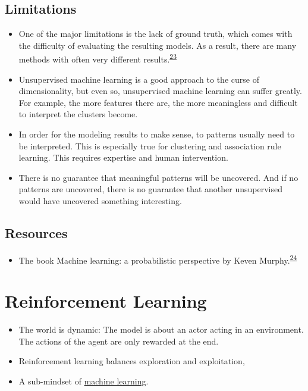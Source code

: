 \documentclass[
  10pt,
]{scrbook}
\providecommand{\tightlist}{%
  \setlength{\itemsep}{0pt}\setlength{\parskip}{0pt}}
\begin{document}
\hypertarget{limitations-7}{%
\section{Limitations}\label{limitations-7}}

\begin{itemize}
\tightlist
\item
  One of the major limitations is the lack of ground truth, which comes with the difficulty of evaluating the resulting models. As a result, there are many methods with often very different results.\textsuperscript{\protect\hyperlink{ref-hastie2009elements}{23}}
\item
  Unsupervised machine learning is a good approach to the curse of dimensionality, but even so, unsupervised machine learning can suffer greatly. For example, the more features there are, the more meaningless and difficult to interpret the clusters become.
\item
  In order for the modeling results to make sense, to patterns usually need to be interpreted. This is especially true for clustering and association rule learning. This requires expertise and human intervention.
\item
  There is no guarantee that meaningful patterns will be uncovered. And if no patterns are uncovered, there is no guarantee that another unsupervised would have uncovered something interesting.
\end{itemize}

\hypertarget{resources-1}{%
\section{Resources}\label{resources-1}}

\begin{itemize}
\tightlist
\item
  The book Machine learning: a probabilistic perspective by Keven Murphy.\textsuperscript{\protect\hyperlink{ref-murphy2012machine}{24}}
\end{itemize}

\hypertarget{reinforcement-learning}{%
\chapter{Reinforcement Learning}\label{reinforcement-learning}}

\begin{itemize}
\tightlist
\item
  The world is dynamic: The model is about an actor acting in an environment. The actions of the agent are only rewarded at the end.
\item
  Reinforcement learning balances exploration and exploitation,
\item
  A sub-mindset of \protect\hyperlink{machine-learning}{machine learning}.
\end{itemize}
\end{document}
